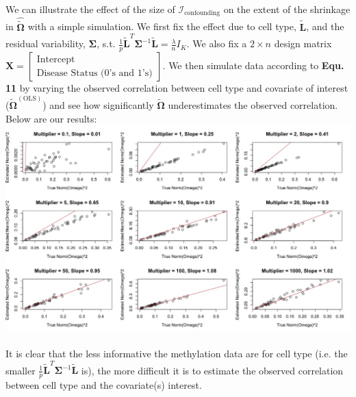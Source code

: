 \documentclass{article}
\begin{document}
\indent We can illustrate the effect of the size of $\mathcal{I}_{\text{confounding}}$ on the extent of the shrinkage in $\hat{\tilde{\bm{\Omega}}}$ with a simple simulation. We first fix the effect due to cell type, $\tilde{\bm{L}}$, and the residual variability, $\bm{\Sigma}$, s.t. $\frac{1}{p}\tilde{\bm{L}}^T \bm{\Sigma}^{-1}\tilde{\bm{L}} = \frac{\lambda}{n}I_K$. We also fix a $2 \times n$ design matrix $\bm{X} = \left[ \begin{matrix}
\text{Intercept}\\
\text{Disease Status (0's and 1's)}
\end{matrix} \right]$. We then simulate data according to \textbf{Equ. 11} by varying the observed correlation between cell type and covariate of interest ($\tilde{\bm{\Omega}}^{(\text{OLS})}$) and see how significantly $\hat{\tilde{\bm{\Omega}}}$ underestimates the observed correlation. Below are our results:\\
\includegraphics[scale=0.4]{UnderestimatingOmega_Multipliers.jpeg}\\
\\
It is clear that the less informative the methylation data are for cell type (i.e. the smaller $\frac{1}{p}\tilde{\bm{L}}^T \bm{\Sigma}^{-1}\tilde{\bm{L}}$ is), the more difficult it is to estimate the observed correlation between cell type and the covariate(s) interest.\\
\end{document}
